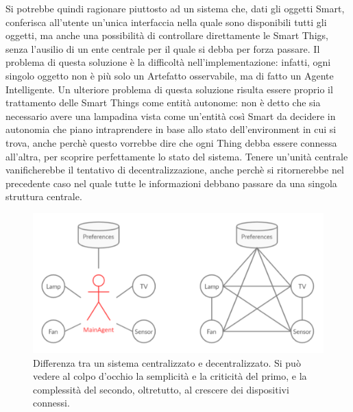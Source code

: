 \documentclass[12pt,a4paper,openright,oneside]{report}
\begin{document}
Si potrebbe quindi ragionare piuttosto ad un sistema che, dati gli oggetti Smart, conferisca all'utente un'unica interfaccia nella quale sono disponibili tutti gli oggetti, ma anche una possibilità di controllare direttamente le Smart Thigs, senza l'ausilio di un ente centrale per il quale si debba per forza passare. Il problema di questa soluzione è la difficoltà nell'implementazione: infatti, ogni singolo oggetto non è più solo un Artefatto osservabile, ma di fatto un Agente Intelligente. Un ulteriore problema di questa soluzione risulta essere proprio il trattamento delle Smart Things come entità autonome: non è detto che sia necessario avere una lampadina vista come un'entità così Smart da decidere in autonomia che piano intraprendere in base allo stato dell'environment in cui si trova, anche perchè questo vorrebbe dire che ogni Thing debba essere connessa all'altra, per scoprire perfettamente lo stato del sistema. Tenere un'unità centrale vanificherebbe il tentativo di decentralizzazione, anche perchè si ritornerebbe nel precedente caso nel quale tutte le informazioni debbano passare da una singola struttura centrale.\\

\begin{figure}[h]
	\centering
	\includegraphics[scale=0.6]{eps/spof.pdf}
	\caption{Differenza tra un sistema centralizzato e decentralizzato. Si può vedere al colpo d'occhio la semplicità e la criticità del primo, e la complessità del secondo, oltretutto, al crescere dei dispositivi connessi.}
	\label{fig:spof}
\end{figure}
\end{document}
